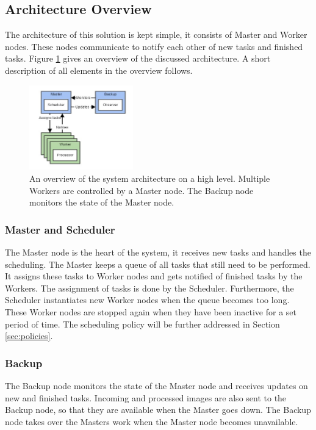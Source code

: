 \documentclass{acm_proc_article-sp}
\begin{document}
\subsection{Architecture Overview}
The architecture of this solution is kept simple, it consists of Master and Worker nodes.
These nodes communicate to notify each other of new tasks and finished tasks.
Figure \ref{fig:architecture_overview} gives an overview of the discussed architecture.
A short description of all elements in the overview follows.

\begin{figure}
	\centering
	\includegraphics[width=0.4\textwidth]{images/architecture_overview.jpg}
	\caption{An overview of the system architecture on a high level. Multiple Workers are controlled by a Master node. The Backup node monitors the state of the Master node.}
	\label{fig:architecture_overview}
\end{figure}

\subsubsection{Master and Scheduler}
The Master node is the heart of the system, it receives new tasks and handles the scheduling.
The Master keeps a queue of all tasks that still need to be performed.
It assigns these tasks to Worker nodes and gets notified of finished tasks by the Workers.
The assignment of tasks is done by the Scheduler.
Furthermore, the Scheduler instantiates new Worker nodes when the queue becomes too long.
These Worker nodes are stopped again when they have been inactive for a set period of time.
The scheduling policy will be further addressed in Section \ref{sec:policies}.

\subsubsection{Backup}
The Backup node monitors the state of the Master node and receives updates on new and finished tasks.
Incoming and processed images are also sent to the Backup node, so that they are available when the Master goes down.
The Backup node takes over the Masters work when the Master node becomes unavailable.
\end{document}

